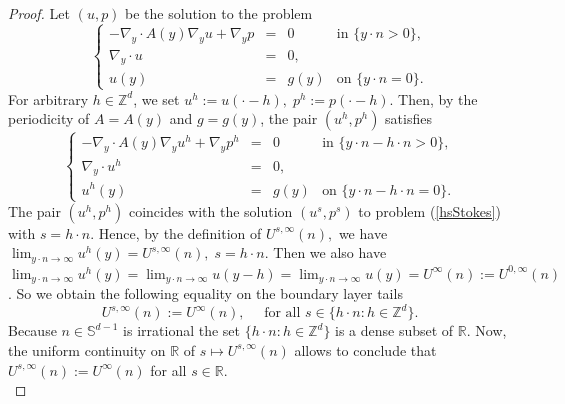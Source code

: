 \documentclass[11pt, reqno]{amsart}
\theoremstyle{definition}
\theoremstyle{remark}
\numberwithin{equation}{section}
\begin{document}
	\begin{proof}[Proof]
		
			Let $(u,p)$ be the solution to the problem
		\begin{equation*}
			\left\{
			\begin{array}{rcll}
				-\nabla_{\!y}\cdot A(y)\nabla_{\!y}  u +  \nabla_{\!y} p&=& 0 & \mbox{in } \{y\cdot n >0 \},\\
				\nabla_{\!y}	\cdot u&=& 0 ,    &\\
				u(y) &=& g(y) & \mbox{on }\{y\cdot n =0 \}.
			\end{array}
			\right. 
		\end{equation*}
	For arbitrary $h\in\mathbb{Z}^d$, we set
		$u^h:=u(\cdot-h),\;  p^h:=p(\cdot-h)$. Then, by the periodicity of $A=A(y)$ and $g=g(y)$,    the pair $(u^h,p^h)$ satisfies
		\begin{equation*}
			\left\{
			\begin{array}{rcll}
			-\nabla_{\!y}\cdot A(y)\nabla_{\!y} u^h +  \nabla_{\!y} p^h&=& 0& \mbox{in } \{y\cdot n - h\cdot n>0 \},\\
		\nabla_{\!y}	\cdot u^h&=& 0 ,    &\\
				u^h(y) &=& g(y)   & \mbox{on }\{y\cdot n - h\cdot n=0 \}.
			\end{array}
			\right. 
		\end{equation*}
		The pair $(u^h,p^h)$ coincides with the solution  $(u^s,p^s)$ to problem (\ref{hsStokes})  with $s=h\cdot n$. Hence, by the definition of $U^{s,\infty}(n),$ we have $\lim_{y\cdot n \rightarrow \infty} u^h (y)= U^{s,\infty}(n),\;  s=h\cdot n$.
		Then we also have $\lim_{y\cdot n \rightarrow \infty} u^h (y)=\lim_{y\cdot n \rightarrow \infty} u (y-h)= \lim_{y\cdot n \rightarrow \infty} u (y)= U^{\infty}(n):= U^{0,\infty}(n)$. So we obtain the following equality on the boundary layer tails 
		\begin{equation*}
			U^{s,\infty}(n):= U^{\infty}(n),\quad \mbox{ for all } s\in \{h\cdot n: h\in \mathbb{Z}^d \}.
		\end{equation*}
		Because $n\in\mathbb{S}^{d-1}$ is irrational the set  $\{h\cdot n: h\in \mathbb{Z}^d \}$ is a dense subset of $\mathbb{R}$. Now, the uniform continuity on $\mathbb{R}$  of $s\mapsto	U^{s,\infty}(n)$  allows to conclude that 	$U^{s,\infty}(n):= U^{\infty}(n)$ for all  $s\in  \mathbb{R}$.\qedhere\\
	\end{proof}
	
	
	\appendix
	
\end{document}
